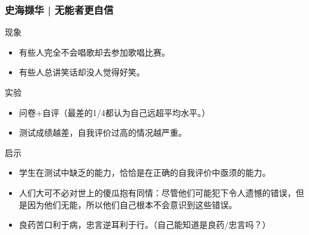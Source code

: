 \begin{frame}
  \frametitle{史海撷华 | 无能者更自信}
  \begin{block}{现象}
    \begin{itemize}
      \item 有些人完全不会唱歌却去参加歌唱比赛。
      \item 有些人总讲笑话却没人觉得好笑。
    \end{itemize}
  \end{block}
  \vspace{-0.3em}
  \pause
  \begin{block}{实验}
    \begin{itemize}
      \item 问卷+自评（最差的1/4都认为自己远超平均水平。）
      \item 测试成绩越差，自我评价过高的情况越严重。
    \end{itemize}
  \end{block}
  \vspace{-0.3em}
  \pause
  \begin{block}{启示}
    \begin{itemize}
      \item 学生在测试中缺乏的能力，恰恰是在正确的自我评价中亟须的能力。
      \item 人们大可不必对世上的傻瓜抱有同情：尽管他们可能犯下令人遗憾的错误，但是因为他们无能，所以他们自己根本不会意识到这些错误。
      \item 良药苦口利于病，忠言逆耳利于行。（自己能知道是良药/忠言吗？）
    \end{itemize}
  \end{block}
\end{frame}

